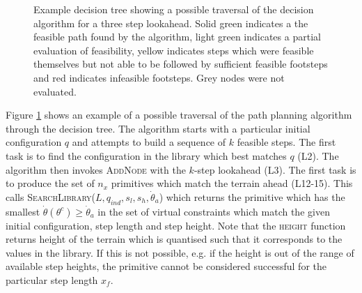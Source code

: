 \begin{figure}
	\centering
	\caption[Example decision tree showing a possible traversal of the decision algorithm]{Example decision tree showing a possible traversal of the decision algorithm for a three step lookahead. Solid green indicates a the feasible path found by the algorithm, light green indicates a partial evaluation of feasibility, yellow indicates steps which were feasible themselves but not able to be followed by sufficient feasible footsteps and red indicates infeasible footsteps. Grey nodes were not evaluated.}
	\label{fig:deciontree}
\end{figure}

Figure \ref{fig:deciontree} shows an example of a possible traversal of the path planning algorithm through the decision tree. The algorithm starts with a particular initial configuration $q$ and attempts to build a sequence of $k$ feasible steps. The first task is to find the configuration in the library which best matches $q$ (L2). The algorithm then invokes \textsc{AddNode} with the $k$-step lookahead (L3). The first task is to produce the set of $n_x$ primitives which match the terrain ahead (L12-15). This calls \textsc{SearchLibrary}($L,q_{ind},s_l,s_h,\dot{\theta}_a$) which returns the primitive which has the smallest $\dot{\theta}(\theta^c) \geq \dot{\theta}_a$ in the set of virtual constraints which match the given initial configuration, step length and step height. Note that the \textsc{height} function returns height of the terrain which is quantised such that it corresponds to the values in the library. If this is not possible, e.g. if the height is out of the range of available step heights, the primitive cannot be considered successful for the particular step length $x_f$.

